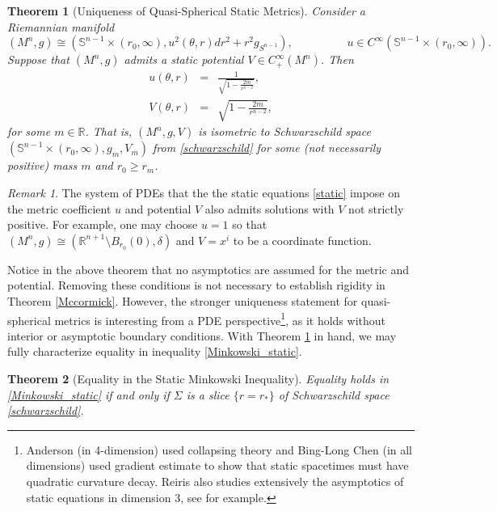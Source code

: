 \documentclass[12pt,twoside]{article}
\theoremstyle{plain}
\newtheorem{theorem}{Theorem}[section]
\theoremstyle{definition}
\theoremstyle{remark}
\newtheorem*{remark}{Remark}
\numberwithin{equation}{section}
\begin{document}
\begin{theorem}[Uniqueness of Quasi-Spherical Static Metrics] \label{main}
Consider a Riemannian manifold
\begin{equation*}
(M^{n},g) \cong (\mathbb{S}^{n-1} \times (r_{0},\infty), u^{2}(\theta,r)dr^{2} + r^{2} g_{S^{n-1}}), \hspace{2cm} u \in C^{\infty}(\mathbb{S}^{n-1} \times (r_{0},\infty)).
\end{equation*}
Suppose that $(M^{n},g)$ admits a static potential $V \in C^{\infty}_{+}(M^{n})$. Then
\begin{eqnarray*}
u(\theta,r) &=& \frac{1}{\sqrt{1 - \frac{2m}{r^{n-2}}}}, \\
V(\theta,r) &=& \sqrt {1 - \frac{2m}{r^{n-2}}}, 
\end{eqnarray*}
for some $m \in \mathbb{R}$. That is, $(M^{n},g,V)$ is isometric to Schwarzschild space $(\mathbb{S}^{n-1} \times (r_{0},\infty), g_{m}, V_{m})$ from \eqref{schwarzschild} for some (not necessarily positive) mass $m$ and $r_{0} \geq r_{m}$.
\end{theorem}
\begin{remark}
The system of PDEs that the the static equations \eqref{static} impose on the metric coefficient $u$ and potential $V$ also admits solutions with $V$ not strictly positive. For example, one may choose $u=1$ so that $(M^{n},g) \cong (\mathbb{R}^{n+1} \setminus B_{r_{0}}(0), \delta)$ and $V=x^{i}$ to be a coordinate function. 
\end{remark}
Notice in the above theorem that no asymptotics are assumed for the metric and potential. Removing these conditions is not necessary to establish rigidity in Theorem \ref{Mccormick}. However, the stronger uniqueness statement for quasi-spherical metrics is interesting from a PDE perspective\footnote{Anderson \cite{Anderson00} (in 4-dimension) used collapsing theory and Bing-Long Chen \cite{Chen19} (in all dimensions) used gradient estimate to show that static spacetimes must have quadratic curvature decay. Reiris also studies extensively the asymptotics of static equations in dimension 3, see \cite{Reiris18} for example.}, as it holds without interior or asymptotic boundary conditions.  With Theorem \ref{main} in hand, we may fully characterize equality in inequality \eqref{Minkowski_static}. 

\begin{theorem}[Equality in the Static Minkowski Inequality] \label{equality case}
Equality holds in \eqref{Minkowski_static} if and only if $\Sigma$ is a slice $\{ r=r_* \}$ of Schwarzschild space \eqref{schwarzschild}.
\end{theorem}
\end{document}
